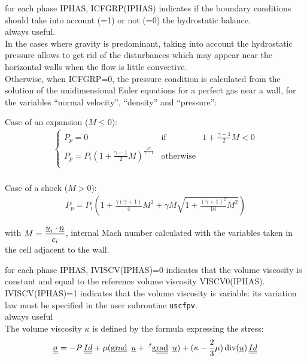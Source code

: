 {for each phase IPHAS, ICFGRP(IPHAS) indicates if the boundary
conditions should take into account (=1) or not (=0) the hydrostatic balance.\\
always useful.\\
In the cases where gravity is predominant, taking into account the hydrostatic
pressure allows to get rid of the disturbances which may appear near the
horizontal walls when the flow is little convective.\\
%
Otherwise, when ICFGRP=0, the pressure condition is calculated
from the solution of the unidimensional Euler equations for a perfect
gas near a wall, for the variables ``normal velocity'', ``density'' and
``pressure'':
\vspace{0.2cm}
\begin{list}{}{}
\item Case of an expansion ($M \leqslant 0$):\\
$$
\begin{array}{l}
\left\{\begin{array}{lll}
P_p=0 & \text{if} & 1 + \displaystyle\frac{\gamma-1}{2}M<0\\
P_p = P_i \left(1 + \displaystyle\frac{\gamma-1}{2}M\right)
^{\frac{2\gamma}{\gamma-1}} & \text{otherwise}\\
\end{array}\right.\\
\end{array}
$$

\item Case of a shock ($M > 0$):\\
$$
\begin{array}{l}
P_p = P_i \left(1 + \displaystyle\frac{\gamma(\gamma+1)}{4}M^2
+\gamma M \displaystyle\sqrt{1+\displaystyle\frac{(\gamma+1)^2}{16}M^2}\right)
\end{array}
$$

with $M = \displaystyle\frac{\underline{u}_i \cdot \underline{n}}{c_i}$, internal
      Mach number calculated with the variables taken in the cell
      adjacent to the wall.\\

\end{list}
}

{for each phase IPHAS, IVISCV(IPHAS)=0 indicates that the volume
viscosity is constant and equal to the reference volume viscosity
VISCV0(IPHAS).\\
IVISCV(IPHAS)=1 indicates that the volume viscosity is variable: its
variation law must be specified in the user subroutine \texttt{uscfpv}.\\
always useful\\
The volume viscosity $\kappa$ is defined by the formula expressing the stress:
\begin{equation}
   \underline{\underline{\sigma}} = -P\,\underline{\underline{Id}} + \mu (\text{g}\underline{\text{rad}}\ \,\underline{u} +  \ ^{t}\text{g}\underline{\underline{\text{rad}}}\ \,\underline{u})
           +(\kappa-\frac{2}{3}\mu)\,\text{div}(\underline{u})\,\underline{\underline{Id}}
\end{equation}
}

